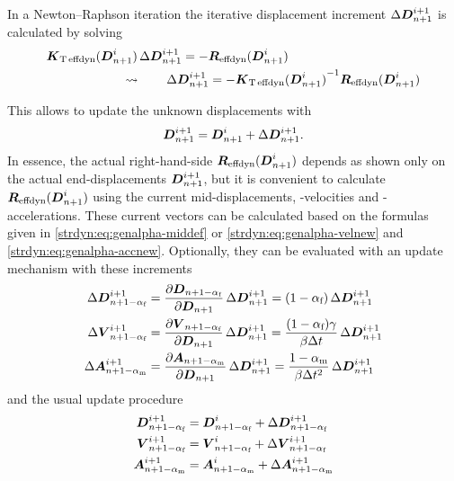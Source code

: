 In a Newton--Raphson iteration the iterative displacement increment
$\Delta\boldsymbol{D}_{n+1}^{i+1}$ is calculated by solving
\begin{align}
&  \boldsymbol{K}_{\text{T}\,\text{effdyn}}(\boldsymbol{D}_{n+1}^i)\, \Delta\boldsymbol{D}_{n+1}^{i+1}
  = - \boldsymbol{R}_{\text{effdyn}}(\boldsymbol{D}_{n+1}^i)
\\
& \qquad\qquad\qquad\leadsto\qquad
  \Delta\boldsymbol{D}_{n+1}^{i+1}
  = - {\boldsymbol{K}_{\text{T}\,\text{effdyn}}(\boldsymbol{D}_{n+1}^i)}^{-1} \boldsymbol{R}_{\text{effdyn}}(\boldsymbol{D}_{n+1}^i)
\end{align}

This allows to update the unknown displacements with
\begin{equation}
  \boldsymbol{D}_{n+1}^{i+1}
  = \boldsymbol{D}_{n+1}^{i} + \Delta\boldsymbol{D}_{n+1}^{i+1}
  \text{.}
\end{equation}
In essence, the actual right-hand-side $\boldsymbol{R}_{\text{effdyn}}(\boldsymbol{D}_{n+1}^{i})$ depends as shown only on the actual end-displacements $\boldsymbol{D}_{n+1}^{i+1}$,
but it is convenient to calculate $\boldsymbol{R}_{\text{effdyn}}(\boldsymbol{D}_{n+1}^i)$ using
the 
current mid-displacements, -velocities and -accelerations. These
current vectors can be calculated based on the formulas given in
\eqref{strdyn:eq:genalpha-middef} or \eqref{strdyn:eq:genalpha-velnew} and
\eqref{strdyn:eq:genalpha-accnew}.  Optionally, they can be evaluated with an update
mechanism with these increments
\begin{equation}
\begin{aligned}
   \Delta\boldsymbol{D}_{n+1-\alpha_\text{f}}^{i+1}
&   = \frac{\partial\boldsymbol{D}_{n+1-\alpha_\text{f}}}{\partial\boldsymbol{D}_{n+1}} 
     \, \Delta\boldsymbol{D}_{n+1}^{i+1}
   = (1-\alpha_\text{f}) \, \Delta\boldsymbol{D}_{n+1}^{i+1}
\\
   \Delta\boldsymbol{V}_{n+1-\alpha_\text{f}}^{i+1}
&   = \frac{\partial\boldsymbol{V}_{n+1-\alpha_\text{f}}}{\partial\boldsymbol{D}_{n+1}} 
     \, \Delta\boldsymbol{D}_{n+1}^{i+1}
   = \frac{(1-\alpha_\text{f})\gamma}{\beta \Delta t} \, \Delta\boldsymbol{D}_{n+1}^{i+1}
\\
   \Delta\boldsymbol{A}_{n+1-\alpha_\text{m}}^{i+1}
&   = \frac{\partial\boldsymbol{A}_{n+1-\alpha_\text{m}}}{\partial\boldsymbol{D}_{n+1}} 
     \, \Delta\boldsymbol{D}_{n+1}^{i+1}
   = \frac{1-\alpha_\text{m}}{\beta \Delta t^2} \, \Delta\boldsymbol{D}_{n+1}^{i+1}
\end{aligned}
\end{equation}
and the usual update procedure
\begin{equation}
\begin{aligned}
   \boldsymbol{D}_{n+1-\alpha_\text{f}}^{i+1}
&  = \boldsymbol{D}_{n+1-\alpha_\text{f}}^{i} 
   + \Delta\boldsymbol{D}_{n+1-\alpha_\text{f}}^{i+1}
\\
   \boldsymbol{V}_{n+1-\alpha_\text{f}}^{i+1}
&  = \boldsymbol{V}_{n+1-\alpha_\text{f}}^{i} 
   + \Delta\boldsymbol{V}_{n+1-\alpha_\text{f}}^{i+1}
\\
   \boldsymbol{A}_{n+1-\alpha_\text{m}}^{i+1}
&  = \boldsymbol{A}_{n+1-\alpha_\text{m}}^{i} 
   + \Delta\boldsymbol{A}_{n+1-\alpha_\text{m}}^{i+1}
\\
\end{aligned}
\end{equation}

